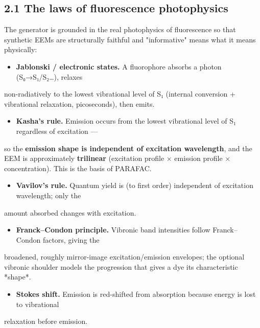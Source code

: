 \documentclass[11pt]{article}
\begin{document}
\subsection*{2.1 The laws of fluorescence photophysics}
The generator is grounded in the real photophysics of fluorescence so that synthetic EEMs are
structurally faithful and "informative" means what it means physically:
\begin{itemize}
\item \textbf{Jablonski / electronic states.} A fluorophore absorbs a photon (S₀→S₁/S₂…), relaxes
\end{itemize}
non-radiatively to the lowest vibrational level of S₁ (internal conversion + vibrational relaxation,
picoseconds), then emits.
\begin{itemize}
\item \textbf{Kasha's rule.} Emission occurs from the lowest vibrational level of S₁ regardless of excitation —
\end{itemize}
so the \textbf{emission shape is independent of excitation wavelength}, and the EEM is approximately
\textbf{trilinear} (excitation profile × emission profile × concentration). This is the basis of PARAFAC.
\begin{itemize}
\item \textbf{Vavilov's rule.} Quantum yield is (to first order) independent of excitation wavelength; only the
\end{itemize}
amount absorbed changes with excitation.
\begin{itemize}
\item \textbf{Franck–Condon principle.} Vibronic band intensities follow Franck–Condon factors, giving the
\end{itemize}
broadened, roughly mirror-image excitation/emission envelopes; the optional vibronic shoulder models
the progression that gives a dye its characteristic *shape*.
\begin{itemize}
\item \textbf{Stokes shift.} Emission is red-shifted from absorption because energy is lost to vibrational
\end{itemize}
relaxation before emission.
\end{document}
